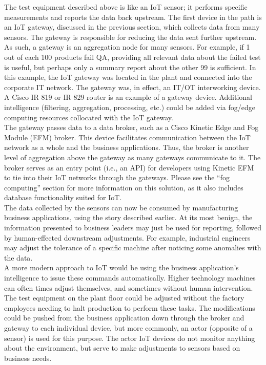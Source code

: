 The test equipment described above is like an IoT sensor; it performs specific
measurements and reports the data back upstream. The first device in the path
is an IoT gateway, discussed in the previous section, which collects data from
many sensors. The gateway is responsible for reducing the data sent further
upstream. As such, a gateway is an aggregation node for many sensors. For
example, if 1 out of each 100 products fail QA, providing all relevant data
about the failed test is useful, but perhaps only a summary report about the
other 99 is sufficient. In this example, the IoT gateway was located in the
plant and connected into the corporate IT network. The gateway was, in effect,
an IT/OT interworking device. A Cisco IR 819 or IR 829 router is an example of
a gateway device. Additional intelligence (filtering, aggregation, processing,
etc.) could be added via fog/edge computing resources collocated with the IoT
gateway. \\

The gateway passes data to a data broker, such as a Cisco Kinetic Edge and Fog
Module (EFM) broker. This device facilitates communication between the IoT
network as a whole and the business applications. Thus, the broker is another
level of aggregation above the gateway as many gateways communicate to it. The
broker serves as an entry point (i.e., an API) for developers using Kinetic
EFM to tie into their IoT networks through the gateways. Please see the ``fog
computing'' section for more information on this solution, as it also includes
database functionality suited for IoT. \\

The data collected by the sensors can now be consumed by manufacturing
business applications, using the story described earlier. At its most benign,
the information presented to business leaders may just be used for reporting,
followed by human-effected downstream adjustments. For example, industrial
engineers may adjust the tolerance of a specific machine after noticing some
anomalies with the data. \\

A more modern approach to IoT would be using the business application's
intelligence to issue these commands automatically. Higher technology machines
can often times adjust themselves, and sometimes without human intervention.
The test equipment on the plant floor could be adjusted without the factory
employees needing to halt production to perform these tasks. The modifications
could be pushed from the business application down through the broker and
gateway to each individual device, but more commonly, an actor (opposite of a
sensor) is used for this purpose. The actor IoT devices do not monitor
anything about the environment, but serve to make adjustments to sensors based
on business needs. \\

